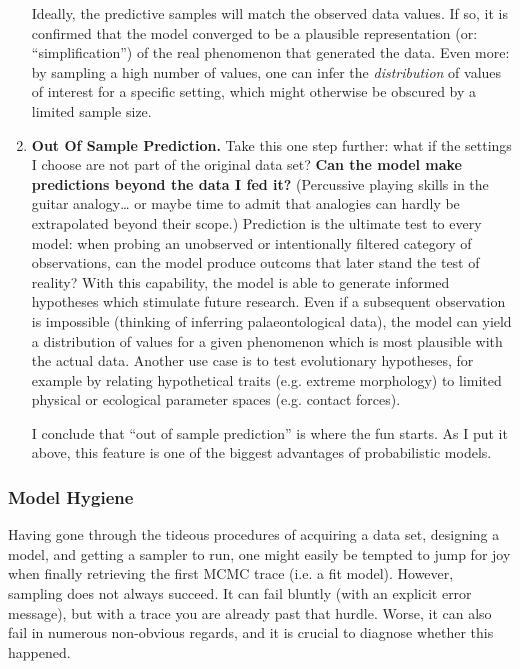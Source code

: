 \begin{enumerate}
Ideally, the predictive samples will match the observed data values.
If so, it is confirmed that the model converged to be a plausible representation (or: ``simplification'') of the real phenomenon that generated the data.
Even more: by sampling a high number of values, one can infer the \emph{distribution} of values of interest for a specific setting, which might otherwise be obscured by a limited sample size.


\item \textbf{Out Of Sample Prediction.}
\label{sec:org7e10c89}
Take this one step further: what if the settings I choose are not part of the original data set?
\textbf{Can the model make predictions beyond the data I fed it?}
(Percussive playing skills in the guitar analogy\ldots{} or maybe time to admit that analogies can hardly be extrapolated beyond their scope.)
Prediction is the ultimate test to every model: when probing an unobserved or intentionally filtered category of observations, can the model produce outcoms that later stand the test of reality?
With this capability, the model is able to generate informed hypotheses which stimulate future research.
Even if a subsequent observation is impossible (thinking of inferring palaeontological data), the model can yield a distribution of values for a given phenomenon which is most plausible with the actual data.
Another use case is to test evolutionary hypotheses, for example by relating hypothetical traits (e.g. extreme morphology) to limited physical or ecological parameter spaces (e.g. contact forces).

I conclude that ``out of sample prediction'' is where the fun starts.
As I put it above, this feature is one of the biggest advantages of probabilistic models.
\end{enumerate}


\subsubsection{Model Hygiene}
\label{workflow:hygiene}
Having gone through the tideous procedures of acquiring a data set, designing a model, and getting a sampler to run, one might easily be tempted to jump for joy when finally retrieving the first MCMC trace (i.e. a fit model).
However, sampling does not always succeed.
It can fail bluntly (with an explicit error message), but with a trace you are already past that hurdle.
Worse, it can also fail in numerous non-obvious regards, and it is crucial to diagnose whether this happened.

